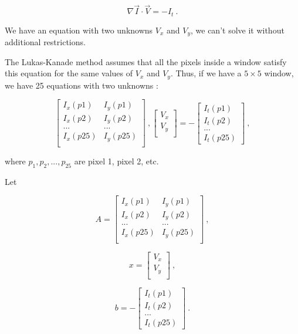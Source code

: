 \begin{equation}
\label{eq:oflowgeneral}
\nabla{\vec{I}} \cdot \vec{V} = -I_t \ .
\end{equation}

We have an equation with two unknowns $V_x$ and $V_y$, we can't solve it without additional restrictions.

The Lukas-Kanade method assumes that all the pixels inside a window satisfy this equation for the same 
values of $V_x$ and $V_y$. Thus, if we have a $5\times5$ window, we have 25 equations with two unknowns :

$$
\begin{bmatrix}
I_x(p1) & I_y(p1) \\
I_x(p2) & I_y(p2) \\
... & ... \\
I_x(p25) & I_y(p25)\\
\end{bmatrix}  \ ,
\begin{bmatrix}
V_x \\
V_y\\
\end{bmatrix}
=
-\begin{bmatrix}
I_t(p1) \\
I_t(p2) \\
...     \\
I_t(p25) 
\end{bmatrix} \ ,
$$

where $p_1, p_2, ..., p_{25}$ are pixel 1, pixel 2, etc.

Let 

$$
A = 
\begin{bmatrix}
I_x(p1) & I_y(p1) \\
I_x(p2) & I_y(p2) \\
... & ... \\
I_x(p25) & I_y(p25)\\
\end{bmatrix}  \ ,
$$

$$
x=
\begin{bmatrix}
V_x \\
V_y\\
\end{bmatrix} \ ,
$$

$$
b=
-\begin{bmatrix}
I_t(p1) \\
I_t(p2) \\
...     \\
I_t(p25) 
\end{bmatrix} \ .
$$

